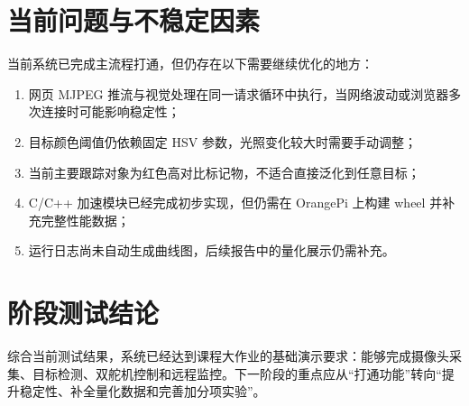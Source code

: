 \section{当前问题与不稳定因素}

当前系统已完成主流程打通，但仍存在以下需要继续优化的地方：

\begin{enumerate}
  \item 网页 MJPEG 推流与视觉处理在同一请求循环中执行，当网络波动或浏览器多次连接时可能影响稳定性；
  \item 目标颜色阈值仍依赖固定 HSV 参数，光照变化较大时需要手动调整；
  \item 当前主要跟踪对象为红色高对比标记物，不适合直接泛化到任意目标；
  \item C/C++ 加速模块已经完成初步实现，但仍需在 OrangePi 上构建 wheel 并补充完整性能数据；
  \item 运行日志尚未自动生成曲线图，后续报告中的量化展示仍需补充。
\end{enumerate}

\section{阶段测试结论}

综合当前测试结果，系统已经达到课程大作业的基础演示要求：能够完成摄像头采集、目标检测、双舵机控制和远程监控。下一阶段的重点应从“打通功能”转向“提升稳定性、补全量化数据和完善加分项实验”。

